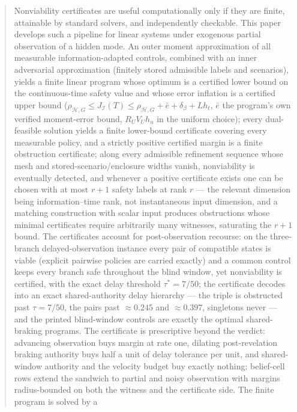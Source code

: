 \documentclass[10pt,twocolumn]{article}
\theoremstyle{plain}
\theoremstyle{definition}
\theoremstyle{remark}
\begin{document}
\begin{abstract}
Nonviability certificates are useful computationally only if they are finite,
attainable by standard solvers, and independently checkable. This paper
develops such a pipeline for linear systems under exogenous partial
observation of a hidden mode. An outer moment approximation of all measurable
information-adapted controls, combined with an inner adversarial approximation (finitely stored
admissible labels and scenarios), yields a finite linear program whose
optimum is a certified lower bound on the continuous-time safety value and
whose error inflation is a certified upper bound
(\(\rho_{\mathcal{H},G} \le J_{\mathcal{I}}(T) \le \rho_{\mathcal{H},G} +
\bar{e} + \delta_\beta + L h_t\), \(\bar{e}\) the program's own verified
moment-error bound, \(R_U V_U h_u\) in the uniform choice); every dual-feasible solution yields a finite lower-bound certificate
covering every measurable policy, and a strictly positive certified margin
is a finite obstruction certificate; along every admissible refinement
sequence whose mesh and stored-scenario/enclosure widths vanish,
nonviability is eventually detected, and whenever a positive certificate exists one can be
chosen with at most \(r + 1\) safety labels at rank \(r\) --- the relevant
dimension being information--time rank, not instantaneous input dimension,
and a matching construction with scalar input produces obstructions whose
minimal certificates require arbitrarily many witnesses, saturating the
\(r + 1\) bound. The certificates account for post-observation
recourse: on the three-branch delayed-observation instance every pair of compatible
states is viable (explicit pairwise policies are carried exactly) and a
common control keeps every branch safe throughout the blind window, yet nonviability is certified, with the exact
delay threshold \(\tau^{*} = 7/50\); the certificate decodes into an
exact shared-authority delay hierarchy --- the triple is obstructed past
\(\tau = 7/50\), the pairs past \(\approx 0.245\) and \(\approx
0.397\), singletons never --- and the printed blind-window controls are
exactly the optimal shared-braking programs. The certificate is
prescriptive beyond the verdict: advancing observation buys margin at rate
one, dilating post-revelation braking authority buys half a unit of delay
tolerance per unit, and shared-window authority and the velocity budget buy
exactly nothing; belief-cell rows extend the sandwich to partial and noisy
observation with margins radius-bounded on both the witness and the
certificate side. The finite program is solved by a

\end{abstract}
\end{document}
